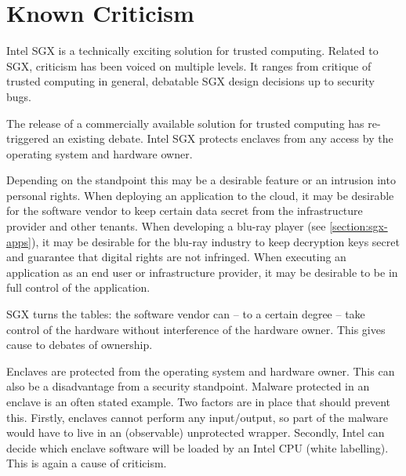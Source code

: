 \section{Known Criticism\label{ID_806492894}\label{section:sgx-criticism}}
Intel SGX is a technically exciting solution for trusted computing.\label{ID_1751677516}
Related to SGX, criticism has been voiced on multiple levels.\label{ID_1329458344}
It ranges from critique of trusted computing in general, debatable SGX design decisions up to security bugs.\label{ID_49832717}
\begin{description}\label{ID_1676577849}
\item[Trusted computing in general:]\label{ID_1171380944}
The release of a commercially available solution for trusted computing has re-triggered an existing debate. Intel SGX protects enclaves from any access by the operating system and hardware owner.\label{ID_1042141723}

Depending on the standpoint this may be a desirable feature or an intrusion into personal rights.\label{ID_996020323}
When deploying an application to the cloud, it may be desirable for the software vendor to keep certain data secret from the infrastructure provider and other tenants.\label{ID_1818979325}
When developing a blu-ray player (see \autoref{section:sgx-apps}), it may be desirable for the blu-ray industry to keep decryption keys secret and guarantee that digital rights are not infringed.\label{ID_606336711}
When executing an application as an end user or infrastructure provider, it may be desirable to be in full control of the application.\label{ID_130834011}

SGX turns the tables: the software vendor can -- to a certain degree -- take control of the hardware without interference of the hardware owner.\label{ID_1498236698}
This gives cause to debates of ownership.\label{ID_290775852}
\item[Malware in enclaves:]\label{ID_1718158893}
Enclaves are protected from the operating system and hardware owner. This can also be a disadvantage from a security standpoint. Malware protected in an enclave is an often stated example.\label{ID_1912630411}
Two factors are in place that should prevent this.\label{ID_1621688747}
Firstly, enclaves cannot perform any input/output, so part of the malware would have to live in an (observable) unprotected wrapper.\cite[ch. 6.8]{sgx-explained}\label{ID_161645023}
Secondly, Intel can decide which enclave software will be loaded by an Intel CPU (white labelling). This is again a cause of criticism.\label{ID_351871068}


\end{description}
